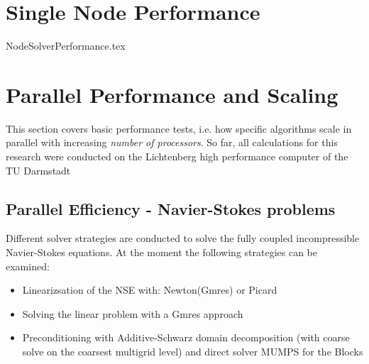 \documentclass[a4paper,10pt]{report} %
\begin{document}
\chapter{Single Node Performance}
\label{sec:SingleNodePerformance}
{NodeSolverPerformance.tex}

\chapter{Parallel Performance and Scaling}
\label{sec:ParallelPerformance}
This section covers basic performance tests, i.e. how specific algorithms scale in parallel with increasing \emph{number of processors}. So far, all calculations for this research were conducted on the Lichtenberg high performance computer of the TU Darmstadt

\section{Parallel Efficiency - Navier-Stokes problems}
Different solver strategies are conducted to solve the fully coupled incompressible Navier-Stokes equations. At the moment the following strategies can be examined:
\begin{itemize}
	\item Linearizsation of the NSE with: Newton(Gmres) or Picard
	\item Solving the linear problem with a Gmres approach
	\item Preconditioning with Additive-Schwarz domain decomposition (with coarse solve on the coarsest multigrid level) and direct solver MUMPS for the Blocks
\end{itemize}
\end{document}
